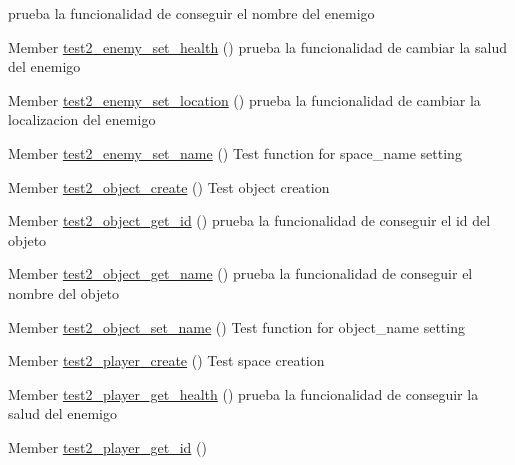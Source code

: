 \begin{DoxyRefList}
%
prueba la funcionalidad de conseguir el nombre del enemigo  
\item[Member \mbox{\hyperlink{enemy__test_8h_a11c126046735b45874e43134aebc329b}{test2\+\_\+enemy\+\_\+set\+\_\+health}} ()]\label{test__test000018}%
%
prueba la funcionalidad de cambiar la salud del enemigo  
\item[Member \mbox{\hyperlink{enemy__test_8h_a19d6783a79e79fe7b6723583cca6657a}{test2\+\_\+enemy\+\_\+set\+\_\+location}} ()]\label{test__test000011}%
%
prueba la funcionalidad de cambiar la localizacion del enemigo  
\item[Member \mbox{\hyperlink{enemy__test_8h_a112a33a8bdf4808b0725cc8c9f240de1}{test2\+\_\+enemy\+\_\+set\+\_\+name}} ()]\label{test__test000004}%
%
Test function for space\+\_\+name setting  
\item[Member \mbox{\hyperlink{object__test_8h_add54ab5e33a1b0a93e9ddcf73591bd9f}{test2\+\_\+object\+\_\+create}} ()]\label{test__test000021}%
%
Test object creation  
\item[Member \mbox{\hyperlink{object__test_8h_a1ff250f0f43297f57fcce1f3a6ae490b}{test2\+\_\+object\+\_\+get\+\_\+id}} ()]\label{test__test000023}%
%
prueba la funcionalidad de conseguir el id del objeto  
\item[Member \mbox{\hyperlink{object__test_8h_abdfafbc7b8588d3dcdb05fd2beb2397e}{test2\+\_\+object\+\_\+get\+\_\+name}} ()]\label{test__test000028}%
%
prueba la funcionalidad de conseguir el nombre del objeto  
\item[Member \mbox{\hyperlink{object__test_8h_acf42b7e7be91ede243f2aaa56c4c9347}{test2\+\_\+object\+\_\+set\+\_\+name}} ()]\label{test__test000025}%
%
Test function for object\+\_\+name setting  
\item[Member \mbox{\hyperlink{player__test_8h_a4f6eca5f9d8c08d2a7fc70c209ecf854}{test2\+\_\+player\+\_\+create}} ()]\label{test__test000030}%
%
Test space creation  
\item[Member \mbox{\hyperlink{player__test_8h_a0d0d1c26e649578825cab7206d78b5c5}{test2\+\_\+player\+\_\+get\+\_\+health}} ()]\label{test__test000044}%
%
prueba la funcionalidad de conseguir la salud del enemigo  
\item[Member \mbox{\hyperlink{player__test_8h_a9fa80f0c0e46b45eb9f1685b102a5826}{test2\+\_\+player\+\_\+get\+\_\+id}} ()]\label{test__test000037}%

\end{DoxyRefList}
